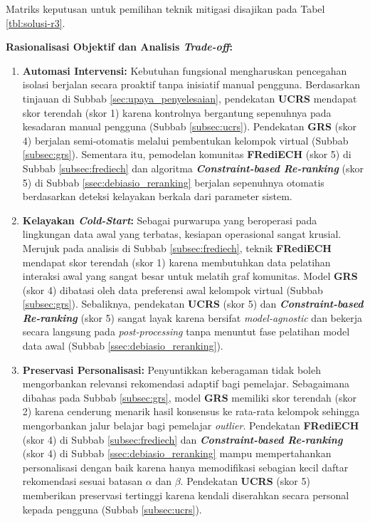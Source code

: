 Matriks keputusan untuk pemilihan teknik mitigasi disajikan pada Tabel \ref{tbl:solusi-r3}.



\textbf{Rasionalisasi Objektif dan Analisis \textit{Trade-off}:}
\begin{enumerate}
    \item \textbf{Automasi Intervensi:} Kebutuhan fungsional mengharuskan pencegahan isolasi berjalan secara proaktif tanpa inisiatif manual pengguna. Berdasarkan tinjauan di Subbab \ref{sec:upaya_penyelesaian}, pendekatan \textbf{UCRS} mendapat skor terendah (skor 1) karena kontrolnya bergantung sepenuhnya pada kesadaran manual pengguna (Subbab \ref{subsec:ucrs}). Pendekatan \textbf{GRS} (skor 4) berjalan semi-otomatis melalui pembentukan kelompok virtual (Subbab \ref{subsec:grs}). Sementara itu, pemodelan komunitas \textbf{FRediECH} (skor 5) di Subbab \ref{subsec:frediech} dan algoritma \textbf{\textit{Constraint-based Re-ranking}} (skor 5) di Subbab \ref{ssec:debiasio_reranking} berjalan sepenuhnya otomatis berdasarkan deteksi kelayakan berkala dari parameter sistem.
    
    \item \textbf{Kelayakan \textit{Cold-Start}:} Sebagai purwarupa yang beroperasi pada lingkungan data awal yang terbatas, kesiapan operasional sangat krusial. Merujuk pada analisis di Subbab \ref{subsec:frediech}, teknik \textbf{FRediECH} mendapat skor terendah (skor 1) karena membutuhkan data pelatihan interaksi awal yang sangat besar untuk melatih graf komunitas. Model \textbf{GRS} (skor 4) dibatasi oleh data preferensi awal kelompok virtual (Subbab \ref{subsec:grs}). Sebaliknya, pendekatan \textbf{UCRS} (skor 5) dan \textbf{\textit{Constraint-based Re-ranking}} (skor 5) sangat layak karena bersifat \textit{model-agnostic} dan bekerja secara langsung pada \textit{post-processing} tanpa menuntut fase pelatihan model data awal (Subbab \ref{ssec:debiasio_reranking}).
    
    \item \textbf{Preservasi Personalisasi:} Penyuntikkan keberagaman tidak boleh mengorbankan relevansi rekomendasi adaptif bagi pemelajar. Sebagaimana dibahas pada Subbab \ref{subsec:grs}, model \textbf{GRS} memiliki skor terendah (skor 2) karena cenderung menarik hasil konsensus ke rata-rata kelompok sehingga mengorbankan jalur belajar bagi pemelajar \textit{outlier}. Pendekatan \textbf{FRediECH} (skor 4) di Subbab \ref{subsec:frediech} dan \textbf{\textit{Constraint-based Re-ranking}} (skor 4) di Subbab \ref{ssec:debiasio_reranking} mampu mempertahankan personalisasi dengan baik karena hanya memodifikasi sebagian kecil daftar rekomendasi sesuai batasan $\alpha$ dan $\beta$. Pendekatan \textbf{UCRS} (skor 5) memberikan preservasi tertinggi karena kendali diserahkan secara personal kepada pengguna (Subbab \ref{subsec:ucrs}).
\end{enumerate}

